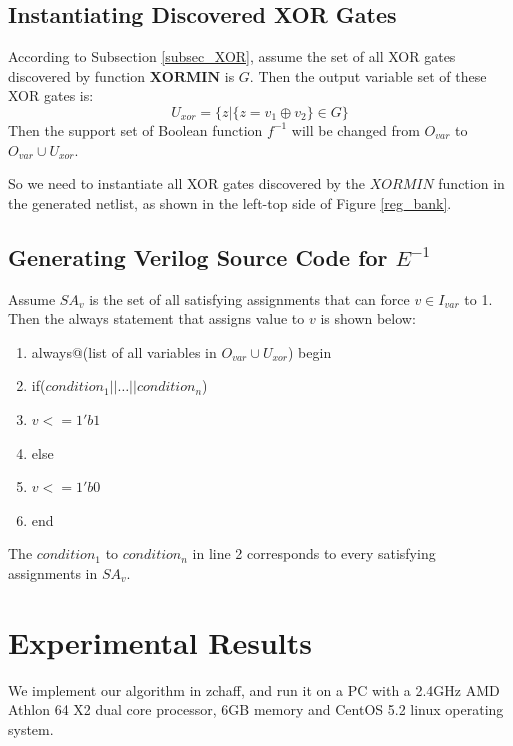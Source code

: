 \documentclass[journal]{IEEEtran}
\begin{document}
\subsection{Instantiating Discovered XOR Gates}\label{subsec_insxor}
According to Subsection \ref{subsec_XOR},
assume the set of all XOR gates discovered by function $\boldsymbol{XORMIN}$ is $G$.
Then the output variable set of these XOR gates is:
\begin{equation}
U_{xor}=\Big\{z|\{z=v_1\oplus v_2\}\in G\Big\}
\end{equation}
Then the support set of Boolean function $f^{-1}$ will be changed from $O_{var}$ to $O_{var}\cup U_{xor}$.

So we need to instantiate all XOR gates discovered by the $XORMIN$ function in the generated netlist,
as shown in the left-top side of Figure \ref{reg_bank}.

\subsection{Generating Verilog Source Code for $E^{-1}$}\label{subsec_genverilog}
Assume $SA_v$ is the set of all satisfying assignments that can force $v\in I_{var}$ to 1.
Then the always statement that assigns value to $v$ is shown below:
\begin{enumerate}
\item always@(list of all variables in $O_{var}\cup U_{xor}$) begin
\item \hspace{0.3cm}if($condition_1 || \dots || condition_n$)
\item \hspace{0.6cm} $v<=1'b1$
\item \hspace{0.3cm}else
\item \hspace{0.6cm} $v<=1'b0$
\item end
\end{enumerate}

The $condition_1$ to $condition_n$ in line 2 corresponds to every satisfying assignments in $SA_v$.

\section{Experimental Results}\label{sec_exp}
We implement our algorithm in zchaff\cite{CHAFF},
and run it on a PC with a 2.4GHz AMD Athlon 64 X2 dual core processor, 6GB memory and CentOS 5.2 linux operating system.
\end{document}

